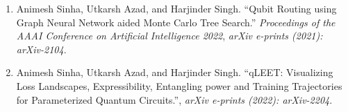 \begin{enumerate}
    \item Animesh Sinha, Utkarsh Azad, and Harjinder Singh. ``Qubit Routing using Graph Neural Network aided Monte Carlo Tree Search.'' \textit{Proceedings of the AAAI Conference on Artificial Intelligence 2022}, \textit{arXiv e-prints (2021): arXiv-2104}.
    \item Animesh Sinha, Utkarsh Azad, and Harjinder Singh. ``qLEET: Visualizing Loss Landscapes, Expressibility, Entangling power and Training Trajectories for Parameterized Quantum Circuits.'', \textit{arXiv e-prints (2022): arXiv-2204}.
\end{enumerate}

